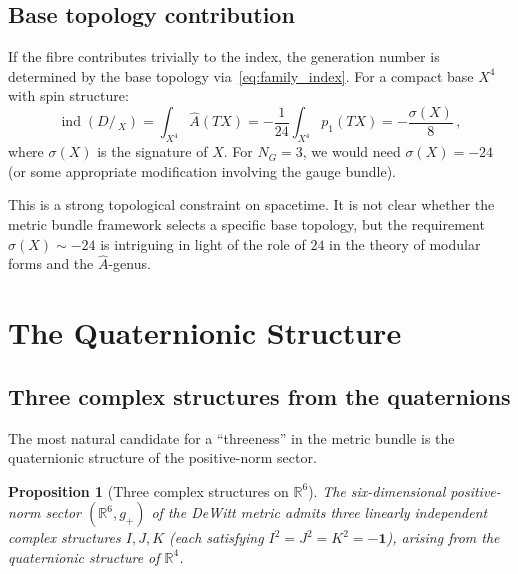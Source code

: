 \documentclass[12pt,a4paper]{article}
\newtheorem{proposition}[theorem]{Proposition}
\theoremstyle{definition}
\newcommand{\ind}{\operatorname{ind}}
\newcommand{\R}{\mathbb{R}}
\newcommand{\Ahat}{\hat{A}}
\begin{document}
\subsection{Base topology contribution}

If the fibre contributes trivially to the index, the generation number is determined by the base topology via~\eqref{eq:family_index}.
For a compact base $X^4$ with spin structure:
\begin{equation}
\ind(D\!\!\!\!/\,_X) = \int_{X^4} \Ahat(TX) = -\frac{1}{24} \int_{X^4} p_1(TX) = -\frac{\sigma(X)}{8}\,,
\end{equation}
where $\sigma(X)$ is the signature of $X$.
For $N_G = 3$, we would need $\sigma(X) = -24$ (or some appropriate modification involving the gauge bundle).

This is a strong topological constraint on spacetime.
It is not clear whether the metric bundle framework selects a specific base topology, but the requirement $\sigma(X) \sim -24$ is intriguing in light of the role of $24$ in the theory of modular forms and the $\hat{A}$-genus.


\section{The Quaternionic Structure}
\label{sec:quaternionic}

\subsection{Three complex structures from the quaternions}

The most natural candidate for a ``threeness'' in the metric bundle is the quaternionic structure of the positive-norm sector.

\begin{proposition}[Three complex structures on $\R^6$]
\label{prop:quaternionic}
The six-dimensional positive-norm sector $(\R^6, g_+)$ of the DeWitt metric admits three linearly independent complex structures $I, J, K$ (each satisfying $I^2 = J^2 = K^2 = -\mathbf{1}$), arising from the quaternionic structure of $\R^4$.
\end{proposition}
\end{document}
